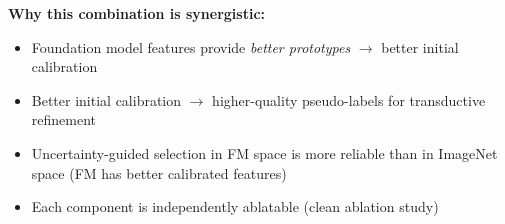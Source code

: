 \documentclass[11pt,a4paper]{article}
\begin{document}
\textbf{Why this combination is synergistic:}
\begin{itemize}[nosep]
    \item Foundation model features provide \textit{better prototypes} $\rightarrow$ better initial calibration
    \item Better initial calibration $\rightarrow$ higher-quality pseudo-labels for transductive refinement
    \item Uncertainty-guided selection in FM space is more reliable than in ImageNet space (FM has better calibrated features)
    \item Each component is independently ablatable (clean ablation study)
\end{itemize}
\end{document}
